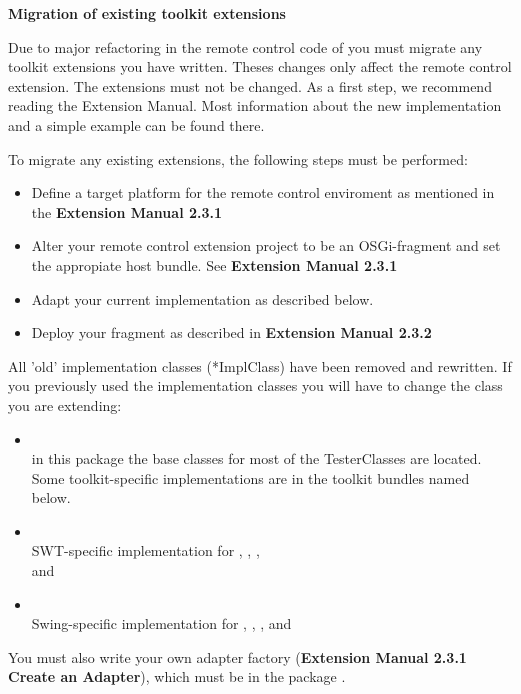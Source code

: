 \textbf{Migration of existing toolkit extensions}

Due to major refactoring in the remote control code of \app{} you must migrate any toolkit extensions you have written. Theses changes only affect the remote control extension. The \ite{} extensions must not be changed. As a first step, we recommend reading the Extension Manual. Most information about the new implementation and a simple example can be found there.

To migrate any existing extensions, the following steps must be performed:
\begin{itemize}
\item Define a target platform for the remote control enviroment as mentioned in the \textbf{Extension Manual 2.3.1}
\item Alter your remote control extension project to be an OSGi-fragment and set the appropiate host bundle. See \textbf{Extension Manual 2.3.1}
\item Adapt your current implementation as described below.
\item Deploy your fragment as described in \textbf{Extension Manual 2.3.2}
\end{itemize}

All 'old' implementation classes (*ImplClass) have been removed and rewritten. If you previously used the \app{} implementation classes  you will have to change the class you are extending:
\begin{itemize}
\item {}\\ in this package the base classes for most of the
  TesterClasses are located. Some toolkit-specific implementations are in the toolkit bundles named below.
\item {}\\ SWT-specific implementation for , , ,\\  and 
\item {}\\ Swing-specific implementation for , , ,  and 
\end{itemize}

You must also write your own adapter factory (\textbf{Extension Manual 2.3.1 Create an Adapter}), which must be in the package .


